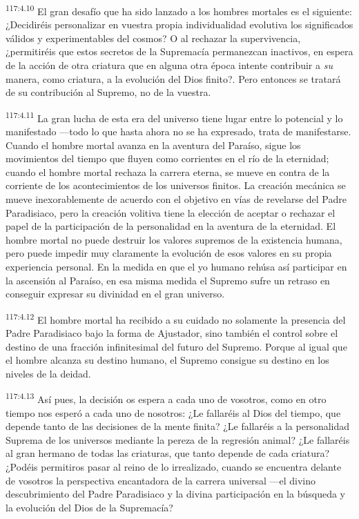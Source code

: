 \documentclass[twoside, 11pt]{book}
\begin{document}
\par
\textsuperscript{117:4.10} El gran desafío que ha sido lanzado a los hombres mortales es el siguiente: ¿Decidiréis personalizar en vuestra propia individualidad evolutiva los significados válidos y experimentables del cosmos? O al rechazar la supervivencia, ¿permitiréis que estos secretos de la Supremacía permanezcan inactivos, en espera de la acción de otra criatura que en alguna otra época intente contribuir a \textit{su} manera, como criatura, a la evolución del Dios finito?. Pero entonces se tratará de su contribución al Supremo, no de la vuestra.

\par
\textsuperscript{117:4.11} La gran lucha de esta era del universo tiene lugar entre lo potencial y lo manifestado ---todo lo que hasta ahora no se ha expresado, trata de manifestarse. Cuando el hombre mortal avanza en la aventura del Paraíso, sigue los movimientos del tiempo que fluyen como corrientes en el río de la eternidad; cuando el hombre mortal rechaza la carrera eterna, se mueve en contra de la corriente de los acontecimientos de los universos finitos. La creación mecánica se mueve inexorablemente de acuerdo con el objetivo en vías de revelarse del Padre Paradisiaco, pero la creación volitiva tiene la elección de aceptar o rechazar el papel de la participación de la personalidad en la aventura de la eternidad. El hombre mortal no puede destruir los valores supremos de la existencia humana, pero puede impedir muy claramente la evolución de esos valores en su propia experiencia personal. En la medida en que el yo humano rehúsa así participar en la ascensión al Paraíso, en esa misma medida el Supremo sufre un retraso en conseguir expresar su divinidad en el gran universo.

\par
\textsuperscript{117:4.12} El hombre mortal ha recibido a su cuidado no solamente la presencia del Padre Paradisiaco bajo la forma de Ajustador, sino también el control sobre el destino de una fracción infinitesimal del futuro del Supremo. Porque al igual que el hombre alcanza su destino humano, el Supremo consigue su destino en los niveles de la deidad.

\par
\textsuperscript{117:4.13} Así pues, la decisión os espera a cada uno de vosotros, como en otro tiempo nos esperó a cada uno de nosotros: ¿Le fallaréis al Dios del tiempo, que depende tanto de las decisiones de la mente finita? ¿Le fallaréis a la personalidad Suprema de los universos mediante la pereza de la regresión animal? ¿Le fallaréis al gran hermano de todas las criaturas, que tanto depende de cada criatura? ¿Podéis permitiros pasar al reino de lo irrealizado, cuando se encuentra delante de vosotros la perspectiva encantadora de la carrera universal ---el divino descubrimiento del Padre Paradisiaco y la divina participación en la búsqueda y la evolución del Dios de la Supremacía?
\end{document}
